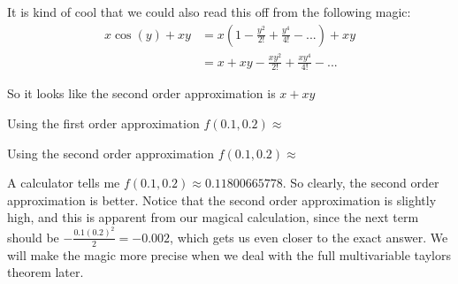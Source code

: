 \documentclass{ximera}
\begin{document}
\begin{question}
		It is kind of cool that we could also read this off from the following magic:
			\begin{align*}
				x\cos(y)+xy &= x(1-\frac{y^2}{2!}+\frac{y^4}{4!}-...)+xy\\	
						&=x+xy-\frac{xy^2}{2!}+\frac{xy^4}{4!}-...
			\end{align*}
		
		So it looks like the second order approximation is $x+xy$
		\begin{solution}
			Using the first order approximation $f(0.1,0.2) \approx$ 
		\end{solution}
		\begin{solution}
			Using the second order approximation $f(0.1,0.2) \approx$ \answer{$0.12$}
		\end{solution}
		
		A calculator tells me $f(0.1,0.2) \approx 0.11800665778$.  So clearly, the second order approximation is better.  Notice that the second order approximation is slightly
		high, and this is apparent from our magical calculation, since the next term should be $-\frac{0.1(0.2)^2}{2}  = -0.002$, which gets us even closer to the exact answer.  We will make the 
		magic more precise when we deal with the full multivariable taylors theorem later.
	\end{question}
	
\end{document}
